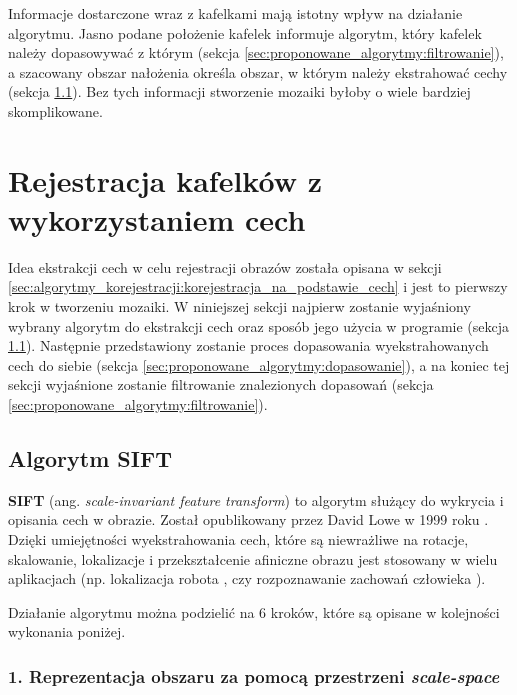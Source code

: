 Informacje dostarczone wraz z kafelkami mają istotny wpływ na działanie algorytmu. Jasno podane położenie kafelek informuje algorytm, który kafelek należy dopasowywać z którym (sekcja \ref{sec:proponowane_algorytmy:filtrowanie}), a szacowany obszar nałożenia określa obszar, w którym należy ekstrahować cechy (sekcja \ref{sec:proponowane_algorytmy:sift}). Bez tych informacji stworzenie mozaiki byłoby o wiele bardziej skomplikowane.

\section{Rejestracja kafelków z wykorzystaniem cech}
\label{sec:proponowane_algorytmy:cechy}

Idea ekstrakcji cech w celu rejestracji obrazów została opisana w sekcji \ref{sec:algorytmy_korejestracji:korejestracja_na_podstawie_cech} i jest to pierwszy krok w tworzeniu mozaiki. W niniejszej sekcji najpierw zostanie wyjaśniony wybrany algorytm do ekstrakcji cech oraz sposób jego użycia w programie (sekcja \ref{sec:proponowane_algorytmy:sift}). Następnie przedstawiony zostanie proces dopasowania wyekstrahowanych cech do siebie (sekcja \ref{sec:proponowane_algorytmy:dopasowanie}), a na koniec tej sekcji wyjaśnione zostanie filtrowanie znalezionych dopasowań (sekcja \ref{sec:proponowane_algorytmy:filtrowanie}).

\subsection{Algorytm SIFT}
\label{sec:proponowane_algorytmy:sift}

\textbf{SIFT} (ang. \textit{scale-invariant feature transform}) to algorytm służący do wykrycia i opisania cech w obrazie. Został opublikowany przez David Lowe w 1999 roku \cite{Lowe:2004:DIF:993451.996342}. Dzięki umiejętności wyekstrahowania cech, które są niewrażliwe na rotacje, skalowanie, lokalizacje i przekształcenie afiniczne obrazu jest stosowany w wielu aplikacjach (np. lokalizacja robota \cite{conf/icra/2001}, czy rozpoznawanie zachowań człowieka \cite{Laptev:2007:LVM:1314710.1314906}).

Działanie algorytmu można podzielić na 6 kroków, które są opisane w kolejności wykonania poniżej.

\subsubsection{1. Reprezentacja obszaru za pomocą przestrzeni \textit{scale-space}}
\label{sec:proponowane_algorytmy:scale_space}

